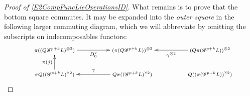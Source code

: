 \documentclass[11pt]{amsart}
\theoremstyle{plain}
\theoremstyle{definition}
\newcommand{\scrG}{\mathscr{G}}
\newcommand{\calw}{\mathcal{W}}
\theoremstyle{plain}
\newcommand{\BSW}{{\scrG}}
\newcommand{\smashcoprod}{\veebar}%
\begin{document}
\begin{Operations in composite functor spectral sequences}
\begin{proof}[Proof of \ref{E2CompFuncLieOperationsID}]
What remains is to prove that the bottom square commutes. It may be expanded into the \emph{outer square} in the following larger commuting diagram, which we will abbreviate by omitting the subscripts on indecomposables functors:
\[
\def\objectstyle{\scriptstyle}
\xymatrix@R=6mm@C=13mm@!0{
&%
\pi((Q\BSW^{p+k}L)^{\otimes2}) \ar[rrr]_-{D_0^{\textup{v}}}
&%
&%
&%
(\pi (Q\BSW^{p+k}L))^{\otimes2}&%
&%
&%
(Q\pi(\BSW^{p+k}L))^{\otimes2} \ar[lll]^-{\gamma^{\otimes2}}\\\\%
&%
\pi Q((\BSW^{p+k}L)^{\smashcoprod 2})\ar[uu]^-{\pi(j)}
&%
&%
&%
Q\pi((\BSW^{p+k}L)^{\smashcoprod 2})\ar[lll]_-{\gamma}
&%
&%
&%
Q((\pi( \BSW^{p+k}L))^{\smashcoprod 2})
}\]
\end{proof}
\end{Operations in composite functor spectral sequences}
\end{document}
